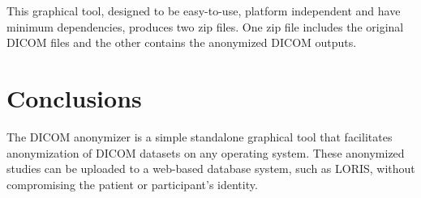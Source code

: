 \documentclass[twocolumn]{bmcart}%
\begin{document}
This graphical tool, designed to be easy-to-use, platform independent
and have minimum dependencies, produces two zip files. One zip file
includes the original DICOM files and the other contains the anonymized
DICOM outputs.

\section{Conclusions}\label{conclusions}

The DICOM anonymizer is a simple standalone graphical tool that
facilitates anonymization of DICOM datasets on any operating system.
These anonymized studies can be uploaded to a web-based database system,
such as LORIS, without compromising the patient or participant's
identity.

\end{document}
